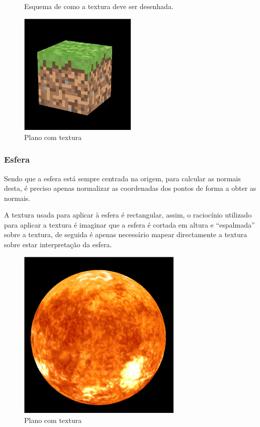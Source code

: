 \documentclass[a4paper]{article}
\begin{document}
\begin{figure}[H]
    \centering
    
    \caption{Esquema de como a textura deve ser desenhada.}
\end{figure}

\begin{figure}[H]
    \centering
    \includegraphics[width=0.5\textwidth]{box.png}
    \caption{Plano com textura}
\end{figure}

\subsubsection{Esfera}\label{sec:esfera}
Sendo que a esfera está sempre centrada na origem, para calcular as normais
desta, é preciso apenas normalizar as coordenadas dos pontos de forma a obter
as normais.

A textura usada para aplicar à esfera é rectangular, assim, o raciocínio
utilizado para aplicar a textura é imaginar que a esfera é cortada em altura e
``espalmada'' sobre a textura, de seguida é apenas necessário mapear
directamente a textura sobre estar interpretação da esfera.

\begin{figure}[H]
    \centering
    \includegraphics[width=0.7\textwidth]{sphere.png}
    \caption{Plano com textura}
\end{figure}
\end{document}
